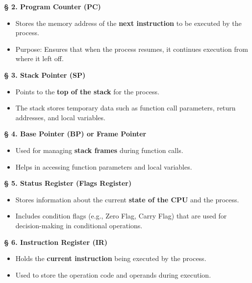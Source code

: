 \documentclass[a4paper]{book}
\newcommand{\sfbf}[1]{{\normalsize\textsf{\textbf{§ #1}}}}
\begin{document}
\sfbf{2. Program Counter (PC)}

\begin{itemize}
\item 
Stores the memory address of the \textbf{next instruction} to be executed by the process.

\item 
Purpose: Ensures that when the process resumes, it continues execution from where it left off.

\end{itemize}

\sfbf{3. Stack Pointer (SP)}

\begin{itemize}
\item 
Points to the \textbf{top of the stack} for the process.

\item 
The stack stores temporary data such as function call parameters, return addresses, and local variables.

\end{itemize}

\sfbf{4. Base Pointer (BP) or Frame Pointer}

\begin{itemize}
\item 
Used for managing \textbf{stack frames} during function calls.

\item 
Helps in accessing function parameters and local variables.

\end{itemize}

\sfbf{5. Status Register (Flags Register)}

\begin{itemize}
\item 
Stores information about the current \textbf{state of the CPU} and the process.

\item 
Includes condition flags (e.g., Zero Flag, Carry Flag) that are used for decision-making in conditional operations.

\end{itemize}

\sfbf{6. Instruction Register (IR)}

\begin{itemize}
\item 
Holds the \textbf{current instruction} being executed by the process.

\item 
Used to store the operation code and operands during execution.

\end{itemize}
\end{document}
